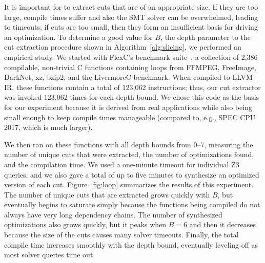 It is important for \minotaur{} to extract cuts that are of an appropriate
size.
%
If they are too large, compile times suffer and also the SMT solver
can be overwhelmed, leading to timeouts; if cuts are too small, then
they form an insufficient basis for driving an optimization.
%
To determine a good value for $B$, the depth parameter to the cut
extraction procedure shown in Algorithm~\ref{alg:slicing}, we
performed an empirical study.
%
We started with FlexC's benchmark suite~\cite{woodruff2023rewriting},
a collection of 2,386 compilable, non-trivial C functions containing
loops from FFMPEG, FreeImage, DarkNet, xz, bzip2, and the LivermoreC
benchmark.
%
When compiled to LLVM IR, these functions contain a total of 123,062
instructions; thus, our cut extractor was invoked 123,062 times for
each depth bound.
%
We chose this code as the basis for our experiment because it is
derived from real applications while also being small enough to
keep compile times manageable (compared to, e.g., SPEC CPU 2017,
which is much larger).


We then ran \minotaur{} on these functions with all depth bounds from
0--7, measuring the number of unique cuts that were extracted, the
number of optimizations found, and the compilation time.
%
We used a one-minute timeout for individual Z3 queries, and we also
gave \minotaur{} a total of up to five minutes to synthesize an optimized
version of each cut.
%
Figure~\ref{fig:loop} summarizes the results of this experiment.
%
The number of unique cuts that are extracted grows quickly with $B$,
but eventually begins to saturate simply because the functions being
compiled do not always have very long dependency chains.
%
The number of synthesized optimizations also grows quickly, but it
peaks when $B=6$ and then it decreases because the size of the cuts
causes many solver timeouts.
%
Finally, the total compile time increases smoothly with the depth
bound, eventually leveling off as most solver queries time out.

